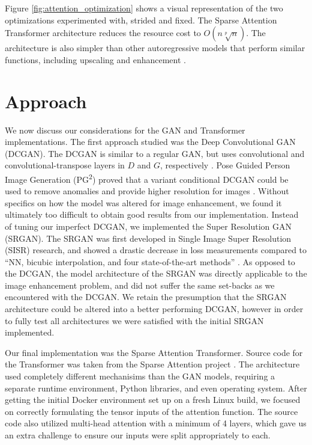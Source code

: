 \documentclass[letterpaper]{article} %
\begin{document}
Figure \ref{fig:attention_optimization} shows a visual representation of
the two optimizations experimented with, strided and fixed.
The Sparse Attention Transformer architecture reduces the resource cost to
$O(n\sqrt[p]{n})$.
The architecture is also simpler than other autoregressive models that perform
similar functions, including upscaling and enhancement \cite{pixel_subscale}.

\section{Approach}
We now discuss our considerations for the GAN and Transformer implementations.
The first approach studied was the
Deep Convolutional GAN (DCGAN).
The DCGAN
is similar to a regular GAN,
but uses convolutional and convolutional-transpose layers in $D$ and $G$, respectively
\cite{unsupervised_learning}.
Pose Guided Person Image Generation (PG\textsuperscript{2})
proved that a variant conditional DCGAN could be used to
remove anomalies and provide higher resolution for images
\cite{pose_guided_image_generation}.
Without specifics on how the model was altered for image enhancement,
we found it ultimately too difficult to obtain good results from our implementation.
Instead of tuning our imperfect DCGAN, we implemented the
Super Resolution GAN (SRGAN).
The SRGAN was first developed in
Single Image Super Resolution (SISR) research, and showed a drastic decrease in loss measurements
compared to ``NN, bicubic interpolation, and four state-of-the-art methods''
\cite{srgan}.
As opposed to the DCGAN,
the model architecture of the SRGAN was directly applicable to the image enhancement problem,
and did not suffer the same set-backs as we encountered with the DCGAN.
We retain the presumption that the SRGAN architecture could be altered into a better performing DCGAN,
however in order to fully test all architectures we were satisfied with the
initial SRGAN implemented.

Our final implementation was the Sparse Attention Transformer.
Source code for the Transformer was
taken from the Sparse Attention project \cite{generative_transformers}.
The architecture used completely different mechanisims than the GAN models,
requiring a separate runtime environment, Python libraries, and even operating system.
After getting the initial Docker environment set up on a fresh Linux build,
we focused on correctly formulating the tensor inputs of the attention function.
The source code also utilized multi-head attention with a minimum of 4 layers,
which gave us an extra challenge to ensure our inputs were split appropriately to each.
\end{document}
